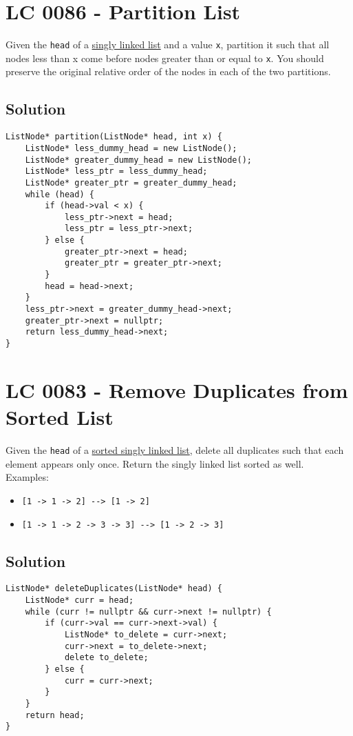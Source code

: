 \section{LC 0086 - Partition List}\label{lc0086}
Given the {\colorbox{CodeBackground}{\lstinline|head|}} of a \ul{singly linked list} and a value {\colorbox{CodeBackground}{\lstinline|x|}}, partition it such that all nodes less than x come before nodes greater than or equal to {\colorbox{CodeBackground}{\lstinline|x|}}. You should preserve the original relative order of the nodes in each of the two partitions.

\subsection*{Solution}
\begin{lstlisting}
ListNode* partition(ListNode* head, int x) {
	ListNode* less_dummy_head = new ListNode();
	ListNode* greater_dummy_head = new ListNode();
	ListNode* less_ptr = less_dummy_head;
	ListNode* greater_ptr = greater_dummy_head;
	while (head) {
		if (head->val < x) {
			less_ptr->next = head;
			less_ptr = less_ptr->next;
		} else {
			greater_ptr->next = head;
			greater_ptr = greater_ptr->next;
		}
		head = head->next;
	}
	less_ptr->next = greater_dummy_head->next;
	greater_ptr->next = nullptr;
	return less_dummy_head->next;
}
\end{lstlisting}

\section{LC 0083 - Remove Duplicates from Sorted List}\label{lc0083}
Given the {\colorbox{CodeBackground}{\lstinline|head|}} of a \ul{sorted singly linked list}, delete all duplicates such that each element appears only once. Return the singly linked list sorted as well.\\

Examples:
\begin{itemize}
\item {\colorbox{CodeBackground}{\lstinline|[1 -> 1 -> 2] --> [1 -> 2]|}}
\item {\colorbox{CodeBackground}{\lstinline|[1 -> 1 -> 2 -> 3 -> 3] --> [1 -> 2 -> 3]|}}
\end{itemize}

\subsection*{Solution}
\begin{lstlisting}
ListNode* deleteDuplicates(ListNode* head) {
	ListNode* curr = head;
	while (curr != nullptr && curr->next != nullptr) {
		if (curr->val == curr->next->val) {
			ListNode* to_delete = curr->next;
			curr->next = to_delete->next;
			delete to_delete;
		} else {
			curr = curr->next;
		}
	}
	return head;
}
\end{lstlisting}

